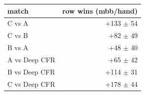 \begin{tabular}{lr}
\toprule
match & row wins (mbb/hand) \\
\midrule
C vs A & +133 $\pm$ 54 \\
C vs B & +82 $\pm$ 49 \\
B vs A & +48 $\pm$ 40 \\
A vs Deep CFR & +65 $\pm$ 42 \\
B vs Deep CFR & +114 $\pm$ 31 \\
C vs Deep CFR & +178 $\pm$ 44 \\
\bottomrule
\end{tabular}
